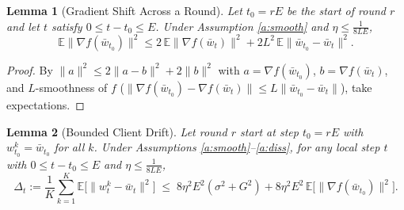\documentclass[11pt]{article}
\newtheorem{lemma}{Lemma}
\begin{document}
\begin{lemma}[Gradient Shift Across a Round]\label{lem:shift}
Let $t_0=rE$ be the start of round $r$ and let $t$ satisfy
$0\le t-t_0\le E$. Under Assumption \ref{a:smooth} and $\eta\le\frac{1}{8LE}$,
\[
\mathbb{E}\|\nabla f(\bar w_{t_0})\|^2
\le 2\,\mathbb{E}\|\nabla f(\bar w_t)\|^2
   + 2L^2\,\mathbb{E}\|\bar w_{t_0}-\bar w_t\|^2 .
\]
\end{lemma}
\begin{proof}
By $\|a\|^2\le 2\|a-b\|^2+2\|b\|^2$ with $a=\nabla f(\bar w_{t_0})$,
$b=\nabla f(\bar w_t)$, and $L$-smoothness of $f$
($\|\nabla f(\bar w_{t_0})-\nabla f(\bar w_t)\|\le L\|\bar w_{t_0}-\bar w_t\|$),
take expectations.
\end{proof}

\begin{lemma}[Bounded Client Drift]\label{lem:drift}
Let round $r$ start at step $t_0 = rE$ with $w_{t_0}^k = \bar w_{t_0}$ for all
$k$. Under Assumptions \ref{a:smooth}--\ref{a:diss}, for any local step
$t$ with $0 \le t - t_0 \le E$ and $\eta \le \tfrac{1}{8LE}$,
\[
\Delta_t := \frac{1}{K}\sum_{k=1}^K \mathbb{E}\big[\|w_t^k - \bar w_t\|^2\big]
\;\le\; 8 \eta^2 E^2 (\sigma^2 + G^2)
        + 8\eta^2 E^2\,\mathbb{E}\big[\|\nabla f(\bar w_{t_0})\|^2\big].
\]
\end{lemma}
\end{document}
